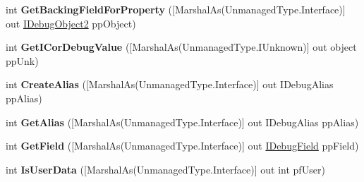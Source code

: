 \begin{DoxyCompactItemize}
\item 
\hypertarget{interface_microsoft_1_1_visual_studio_1_1_debugger_1_1_interop_e_e_1_1_i_debug_object2_af75111542264eeab59f6053297de7d6e}{int {\bfseries Get\+Backing\+Field\+For\+Property} (\mbox{[}Marshal\+As(Unmanaged\+Type.\+Interface)\mbox{]} out \hyperlink{interface_microsoft_1_1_visual_studio_1_1_debugger_1_1_interop_e_e_1_1_i_debug_object2}{I\+Debug\+Object2} pp\+Object)}\label{interface_microsoft_1_1_visual_studio_1_1_debugger_1_1_interop_e_e_1_1_i_debug_object2_af75111542264eeab59f6053297de7d6e}

\item 
\hypertarget{interface_microsoft_1_1_visual_studio_1_1_debugger_1_1_interop_e_e_1_1_i_debug_object2_aa3b9bf5f5b845cd4ff51126474bde855}{int {\bfseries Get\+I\+Cor\+Debug\+Value} (\mbox{[}Marshal\+As(Unmanaged\+Type.\+I\+Unknown)\mbox{]} out object pp\+Unk)}\label{interface_microsoft_1_1_visual_studio_1_1_debugger_1_1_interop_e_e_1_1_i_debug_object2_aa3b9bf5f5b845cd4ff51126474bde855}

\item 
\hypertarget{interface_microsoft_1_1_visual_studio_1_1_debugger_1_1_interop_e_e_1_1_i_debug_object2_a729f3e5d79d54c24b73b50f9adb27c42}{int {\bfseries Create\+Alias} (\mbox{[}Marshal\+As(Unmanaged\+Type.\+Interface)\mbox{]} out I\+Debug\+Alias pp\+Alias)}\label{interface_microsoft_1_1_visual_studio_1_1_debugger_1_1_interop_e_e_1_1_i_debug_object2_a729f3e5d79d54c24b73b50f9adb27c42}

\item 
\hypertarget{interface_microsoft_1_1_visual_studio_1_1_debugger_1_1_interop_e_e_1_1_i_debug_object2_a4e0b0d5072e55eec132a011066f0e909}{int {\bfseries Get\+Alias} (\mbox{[}Marshal\+As(Unmanaged\+Type.\+Interface)\mbox{]} out I\+Debug\+Alias pp\+Alias)}\label{interface_microsoft_1_1_visual_studio_1_1_debugger_1_1_interop_e_e_1_1_i_debug_object2_a4e0b0d5072e55eec132a011066f0e909}

\item 
\hypertarget{interface_microsoft_1_1_visual_studio_1_1_debugger_1_1_interop_e_e_1_1_i_debug_object2_a80ec96f0527b924782db6a1c0e649a0d}{int {\bfseries Get\+Field} (\mbox{[}Marshal\+As(Unmanaged\+Type.\+Interface)\mbox{]} out \hyperlink{interface_microsoft_1_1_visual_studio_1_1_debugger_1_1_interop_e_e_1_1_i_debug_field}{I\+Debug\+Field} pp\+Field)}\label{interface_microsoft_1_1_visual_studio_1_1_debugger_1_1_interop_e_e_1_1_i_debug_object2_a80ec96f0527b924782db6a1c0e649a0d}

\item 
\hypertarget{interface_microsoft_1_1_visual_studio_1_1_debugger_1_1_interop_e_e_1_1_i_debug_object2_a1b6eb82799ac2256a597749cc6b1bb11}{int {\bfseries Is\+User\+Data} (\mbox{[}Marshal\+As(Unmanaged\+Type.\+Interface)\mbox{]} out int pf\+User)}\label{interface_microsoft_1_1_visual_studio_1_1_debugger_1_1_interop_e_e_1_1_i_debug_object2_a1b6eb82799ac2256a597749cc6b1bb11}


\end{DoxyCompactItemize}
